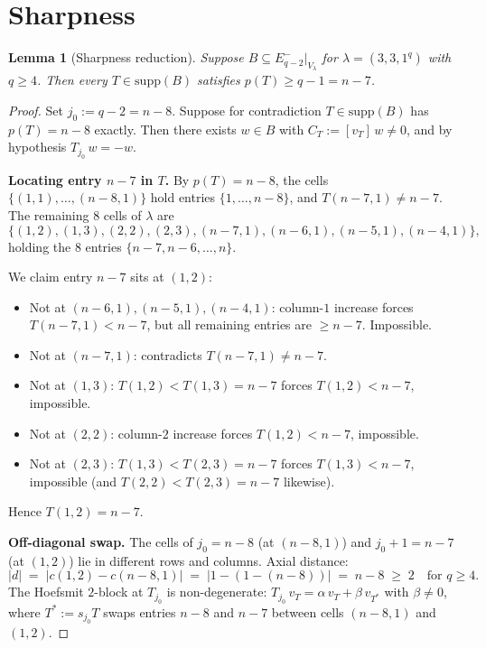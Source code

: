 \documentclass[11pt]{article}
\newtheorem{lemma}[theorem]{Lemma}
\theoremstyle{definition}
\newcommand{\supp}{\mathrm{supp}}
\begin{document}
\section{Sharpness}\label{sec:sharp}

\begin{lemma}[Sharpness reduction]\label{lem:sharp-reduction}
Suppose $B \subseteq E_{q-2}^-|_{V_\lambda}$ for $\lambda = (3, 3, 1^q)$
with $q \ge 4$.  Then every $T \in \supp(B)$ satisfies $p(T) \ge q - 1
= n - 7$.
\end{lemma}

\begin{proof}
Set $j_0 := q - 2 = n - 8$.  Suppose for contradiction $T \in \supp(B)$
has $p(T) = n - 8$ exactly.  Then there exists $w \in B$ with
$C_T := [v_T]\,w \ne 0$, and by hypothesis $T_{j_0}\,w = -w$.

\medskip\textbf{Locating entry $n - 7$ in $T$.}
By $p(T) = n - 8$, the cells $\{(1, 1), \ldots, (n - 8, 1)\}$ hold
entries $\{1, \ldots, n - 8\}$, and $T(n - 7, 1) \ne n - 7$.  The
remaining $8$ cells of $\lambda$ are
\[
   \{(1, 2),(1, 3),(2, 2),(2, 3),(n-7,1),(n-6,1),(n-5,1),(n-4,1)\},
\]
holding the $8$ entries $\{n-7, n-6, \ldots, n\}$.

We claim entry $n - 7$ sits at $(1, 2)$:
\begin{itemize}[topsep=0.3em,itemsep=0.1em]
\item Not at $(n - 6, 1), (n - 5, 1), (n - 4, 1)$: column-$1$
   increase forces $T(n - 7, 1) < n - 7$, but all remaining entries
   are $\ge n - 7$.  Impossible.
\item Not at $(n - 7, 1)$: contradicts $T(n - 7, 1) \ne n - 7$.
\item Not at $(1, 3)$: $T(1, 2) < T(1, 3) = n - 7$ forces
   $T(1, 2) < n - 7$, impossible.
\item Not at $(2, 2)$: column-$2$ increase forces $T(1, 2) < n - 7$,
   impossible.
\item Not at $(2, 3)$: $T(1, 3) < T(2, 3) = n - 7$ forces $T(1, 3) <
   n - 7$, impossible (and $T(2, 2) < T(2, 3) = n - 7$ likewise).
\end{itemize}
Hence $T(1, 2) = n - 7$.

\medskip\textbf{Off-diagonal swap.}
The cells of $j_0 = n - 8$ (at $(n - 8, 1)$) and $j_0 + 1 = n - 7$
(at $(1, 2)$) lie in different rows and columns.  Axial distance:
\[
   |d| \;=\; |c(1, 2) - c(n-8, 1)| \;=\; |1 - (1 - (n-8))| \;=\; n - 8
   \;\ge\; 2 \quad \text{for } q \ge 4.
\]
The Hoefsmit $2$-block at $T_{j_0}$ is non-degenerate: $T_{j_0}\,v_T
= \alpha\,v_T + \beta\,v_{T^*}$ with $\beta \ne 0$, where $T^* :=
s_{j_0}T$ swaps entries $n - 8$ and $n - 7$ between cells $(n - 8, 1)$
and $(1, 2)$.


\end{proof}
\end{document}
